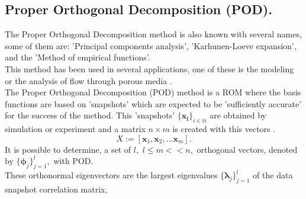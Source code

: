 \documentclass[12pt]{report}
\begin{document}
\subsection*{Proper Orthogonal Decomposition (POD).}
The Proper Orthogonal Decomposition method is also known with several names, some of them are:
'Principal components analysis', 'Karhunen-Loeve expansion', and the 'Method of empirical functions'. \\
This method has been used in several applications, one of these is the modeling or the analysis of flow through 
porous media \cite{Gharbi97,Heijn03,Vermeulen04}.\\
The Proper Orthogonal Decomposition (POD) 
method is a ROM where the basis functions are based on 'snapshots'
which are expected to be 'sufficiently accurate' for the success of the method. This 'snapshots'
$\{ \mathbf{x_i}\} _{i\in \mathbb{N}}$ are obtained
by simulation or experiment and a matrix $n\times m$ is created with this vectors \cite{Mark06}.
\begin{equation}
X:=[\mathbf{x}_1,\mathbf{x}_2,...\mathbf{x}_m].
\end{equation}
It is possible to determine, a set of $l,$ $l\leq m << n,$ orthogonal vectors, denoted by $\{ \mathbf{\phi} _j \} ^l _{j=1},$ 
with POD. \\These orthonormal
eigenvectors are the largest eigenvalues $\{ \mathbf{\lambda} _j \} ^l _{j=1}$ of 
the data snapshot correlation matrix,
\end{document}

